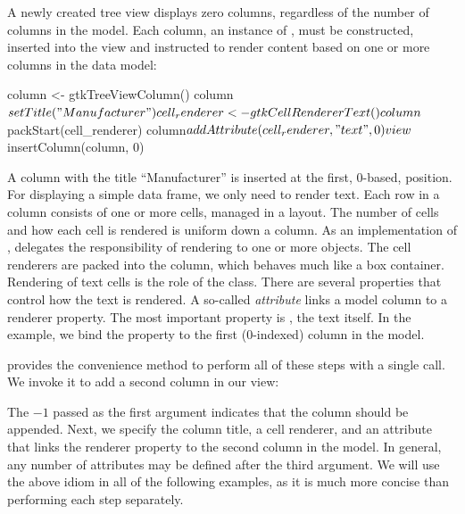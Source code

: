 A newly created tree view displays zero columns, regardless of the
number of columns in the model. Each column, an instance of
, must be constructed, inserted into the view and
instructed to render content based on one or more columns in the data
model:
\begin{Schunk}
\begin{Sinput}
 column <- gtkTreeViewColumn()
 column$setTitle("Manufacturer")
 cell_renderer <- gtkCellRendererText()
 column$packStart(cell_renderer)
 column$addAttribute(cell_renderer, "text", 0)
 view$insertColumn(column, 0)
\end{Sinput}
\end{Schunk}
%
A column with the title ``Manufacturer'' is inserted at the first,
$0$-based, position. For displaying a simple data frame, we only need
to render text. Each row in a column consists of one or more cells,
managed in a layout. The number of cells and how each cell is rendered
is uniform down a column. As an implementation of
,  delegates the
responsibility of rendering to one or more 
objects. The cell renderers are packed into the column, which behaves
much like a box container. Rendering of text cells is the role of the
 class. There are several properties that
control how the text is rendered. A so-called \textit{attribute} links
a model column to a renderer property. The most important property is
, the text itself. In the example, we bind the 
property to the first ($0$-indexed) column in the model.

 provides the
 convenience method to
perform all of these steps with a single call. We invoke it to add a
second column in our view:
\begin{Schunk}
\end{Schunk}
% 
The $-1$ passed as the first argument indicates that the column should
be appended. Next, we specify the column title, a cell renderer, and
an attribute that links the  renderer property to the
second column in the model. In general, any number of attributes may
be defined after the third argument.  We will use the above idiom in
all of the following examples, as it is much more concise than
performing each step separately.

